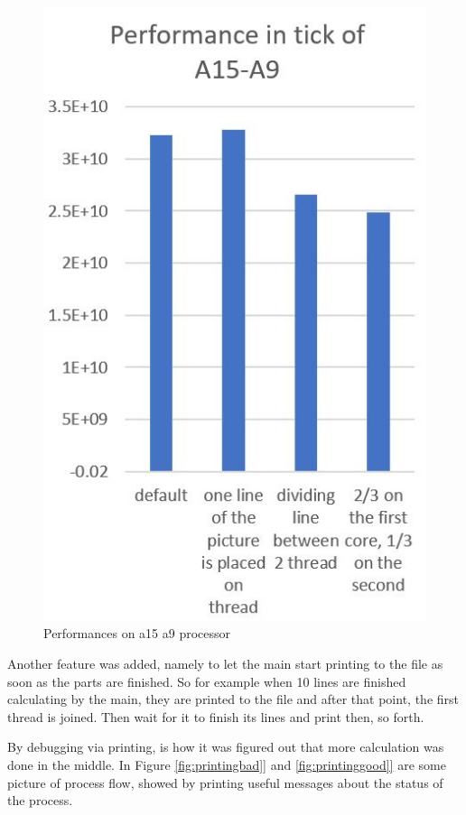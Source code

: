 \documentclass[journal]{IEEEtran}
\begin{document}
\begin{figure}[!h]
	\centering
	\includegraphics[width=.8\linewidth]{a15a9}
	\caption{Performances on a15 a9 processor}
	\label{fig:a15a9}
\end{figure}


Another feature was added, namely to let the main start printing to the file as soon as the parts are finished. So for example when 10 lines are finished calculating by the main, they are printed to the file and after that point, the first thread is joined. Then wait for it to finish its lines and print then, so forth.

By debugging via printing, is how it was figured out that more calculation was done in the middle. In Figure \ref{fig:printingbad]} and \ref{fig:printinggood]} are some picture of process flow, showed by printing useful messages about the status of the process. 
\end{document}
